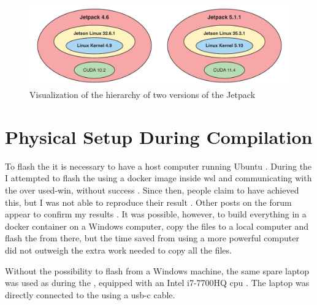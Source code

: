 \begin{figure}[H]
    \centering
    \includegraphics[width=\textwidth]{figures/jetpack_hierarchy/hierarchy.pdf}
    \caption{Visualization of the hierarchy of two versions of the Jetpack\cite{nvidiaJetPackSDK2022}\cite{nvidiaJetPackSDK2023}}
    \label{fig:jetpack_hierarchy}
\end{figure}

\section{Physical Setup During Compilation}
To flash the \jx it is necessary to have a host computer running Ubuntu \cite{nvidiaSDKManager2019}.
During the \preproject I attempted to flash the \jx using a docker image inside \gls{wsl} and communicating with the \jx over used-win, without success \cite{martensPortableSensorRig2022} \cite{nvidiaSDKManager2019} \cite{dorsselaerUsbipdwin2023}.
Since then, people claim to have achieved this, but I was not able to reproduce their result \jx \cite{makinbacon21TUTORIALUsingSdkmanager2022}.
Other posts on the forum appear to confirm my results \cite{2008PleaseProvideMore2022}.
It was possible, however, to build everything in a docker container on a Windows computer, copy the files to a local computer and flash the \jx from there,
but the time saved from using a more powerful computer did not outweigh the extra work needed to copy all the files.

Without the possibility to flash from a Windows machine, the same spare laptop was used as during the \preproject, equipped with an Intel i7-7700HQ \gls{cpu} \cite{martensPortableSensorRig2022}.
The laptop was directly connected to the \jx using a usb-c cable.



